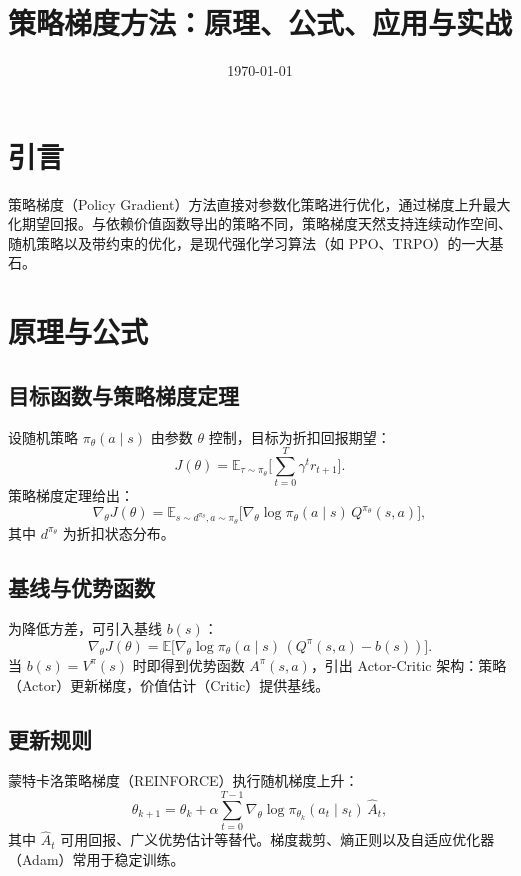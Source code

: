 \documentclass[UTF8,zihao=-4]{ctexart}
\title{策略梯度方法：原理、公式、应用与实战}
\author{}
\date{\today}
\begin{document}
\maketitle

\section{引言}
策略梯度（Policy Gradient）方法直接对参数化策略进行优化，通过梯度上升最大化期望回报。与依赖价值函数导出的策略不同，策略梯度天然支持连续动作空间、随机策略以及带约束的优化，是现代强化学习算法（如 PPO、TRPO）的一大基石。

\section{原理与公式}
\subsection{目标函数与策略梯度定理}
设随机策略 \(\pi_\theta(a\mid s)\) 由参数 \(\theta\) 控制，目标为折扣回报期望：
\begin{equation}
J(\theta) = \mathbb{E}_{\tau \sim \pi_\theta}\Big[ \sum_{t=0}^{T} \gamma^t r_{t+1} \Big].
\end{equation}
策略梯度定理给出：
\begin{equation}
\nabla_\theta J(\theta) = \mathbb{E}_{s \sim d^{\pi_\theta}, a \sim \pi_\theta}\big[ \nabla_\theta \log \pi_\theta(a\mid s)\, Q^{\pi_\theta}(s,a) \big],
\end{equation}
其中 \(d^{\pi_\theta}\) 为折扣状态分布。

\subsection{基线与优势函数}
为降低方差，可引入基线 \(b(s)\)：
\begin{equation}
\nabla_\theta J(\theta) = \mathbb{E}\big[ \nabla_\theta \log \pi_\theta(a\mid s)\, (Q^{\pi}(s,a) - b(s)) \big].
\end{equation}
当 \(b(s)=V^{\pi}(s)\) 时即得到优势函数 \(A^{\pi}(s,a)\)，引出 Actor-Critic 架构：策略（Actor）更新梯度，价值估计（Critic）提供基线。

\subsection{更新规则}
蒙特卡洛策略梯度（REINFORCE）执行随机梯度上升：
\begin{equation}
\theta_{k+1} = \theta_k + \alpha \sum_{t=0}^{T-1} \nabla_\theta \log \pi_{\theta_k}(a_t\mid s_t)\, \hat{A}_t,
\end{equation}
其中 \(\hat{A}_t\) 可用回报、广义优势估计等替代。梯度裁剪、熵正则以及自适应优化器（Adam）常用于稳定训练。
\end{document}

